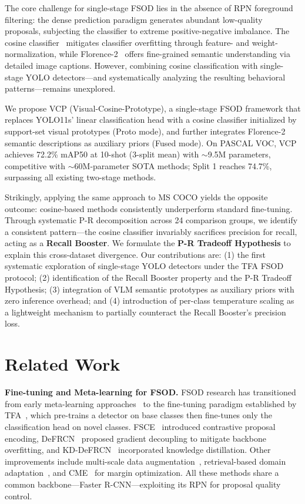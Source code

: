 \documentclass[conference]{IEEEtran}
\newcommand{\myhl}[1]{\colorbox{hlc}{\mbox{#1}}}
\begin{document}
The core challenge for single-stage FSOD lies in the absence of RPN foreground filtering: the dense prediction paradigm generates abundant low-quality proposals, subjecting the classifier to extreme positive-negative imbalance. The cosine classifier~\cite{wang2020tfa} mitigates classifier overfitting through feature- and weight-normalization, while Florence-2~\cite{xiao2024florence2} offers fine-grained semantic understanding via detailed image captions. However, combining cosine classification with single-stage YOLO detectors---and systematically analyzing the resulting behavioral patterns---remains unexplored.

We propose VCP (Visual-Cosine-Prototype), a single-stage FSOD framework that replaces YOLO11s' linear classification head with a cosine classifier initialized by support-set visual prototypes (Proto mode), and further integrates Florence-2 semantic descriptions as auxiliary priors (Fused mode). On PASCAL VOC, VCP achieves 72.2\% mAP50 at 10-shot (3-split mean) with $\sim$9.5M parameters, competitive with $\sim$60M-parameter SOTA methods; Split 1 reaches 74.7\%, surpassing all existing two-stage methods.

Strikingly, applying the same approach to MS COCO yields the opposite outcome: cosine-based methods consistently underperform standard fine-tuning. Through systematic P-R decomposition across 24 comparison groups, we identify a consistent pattern---the cosine classifier invariably sacrifices precision for recall, acting as a \textbf{Recall Booster}. We formulate the \textbf{P-R Tradeoff Hypothesis} to explain this cross-dataset divergence. Our contributions are: (1) the first systematic exploration of single-stage YOLO detectors under the TFA FSOD protocol; (2) identification of the Recall Booster property and the P-R Tradeoff Hypothesis; (3) integration of VLM semantic prototypes as auxiliary priors with zero inference overhead; and (4) introduction of per-class temperature scaling as a lightweight mechanism to partially counteract the Recall Booster's precision loss.

\section{Related Work}

\textbf{Fine-tuning and Meta-learning for FSOD.} FSOD research has transitioned from early meta-learning approaches~\myhl{\cite{huang2025prototype,gao2025decoupling}} to the fine-tuning paradigm established by TFA~\cite{wang2020tfa}, which pre-trains a detector on base classes then fine-tunes only the classification head on novel classes. FSCE~\cite{sun2021fsce} introduced contrastive proposal encoding, DeFRCN~\cite{qiao2021defrcn} proposed gradient decoupling to mitigate backbone overfitting, and KD-DeFRCN~\cite{pei2022kddefrcn} incorporated knowledge distillation. Other improvements include multi-scale data augmentation~\myhl{\cite{vu2025multiperspective}}, retrieval-based domain adaptation~\myhl{\cite{li2025domainrag}}, and CME~\cite{li2021cme} for margin optimization. All these methods share a common backbone---Faster R-CNN---exploiting its RPN for proposal quality control.
\end{document}
